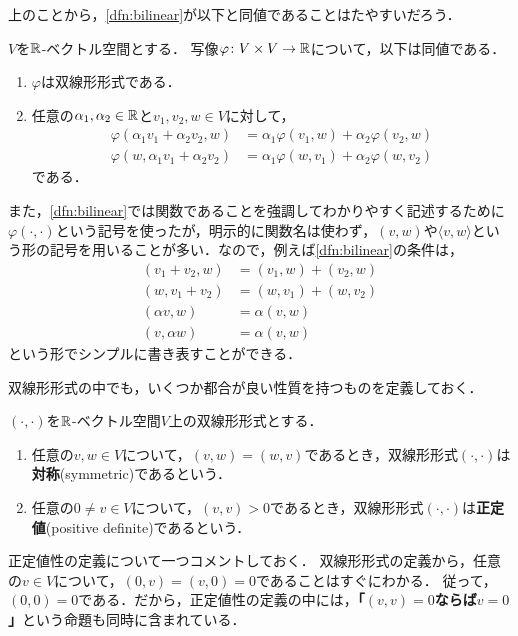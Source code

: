 上のことから，\cref{dfn:bilinear}が以下と同値であることはたやすいだろう．
\begin{prop}
  $V$を$\mathbb{R}$-ベクトル空間とする．
  写像$\varphi\colon V \times V \to \mathbb{R}$について，以下は同値である．
  \begin{enumerate}
    \item $\varphi$は双線形形式である．
    \item 任意の$\alpha_1,\alpha_2 \in \mathbb{R}$と$v_1,v_2,w\in V$に対して，
    \[
      \begin{aligned}
        \varphi(\alpha_1 v_1 + \alpha_2 v_2, w) &= \alpha_1 \varphi(v_1,w) + \alpha_2 \varphi (v_2,w) \\
        \varphi(w, \alpha_1 v_1 + \alpha_2 v_2) &= \alpha_1 \varphi(w,v_1) + \alpha_2 \varphi (w,v_2)
      \end{aligned}
    \]
    である．
  \end{enumerate}
\end{prop}

また，\cref{dfn:bilinear}では関数であることを強調してわかりやすく記述するために$\varphi(\cdot,\cdot)$という記号を使ったが，明示的に関数名は使わず，$(v,w)$や$\langle v,w\rangle$という形の記号を用いることが多い．なので，例えば\cref{dfn:bilinear}の条件は，
\[
  \begin{aligned}
    (v_1 + v_2, w) &= (v_1,w) + (v_2,w) \\
    (w, v_1 + v_2) &= (w,v_1) + (w,v_2) \\
    (\alpha v, w) &= \alpha (v,w) \\
    (v,\alpha w) &= \alpha (v,w)
  \end{aligned}  
\]
という形でシンプルに書き表すことができる．

双線形形式の中でも，いくつか都合が良い性質を持つものを定義しておく．
\begin{dfn}
$(\cdot,\cdot)$を$\mathbb{R}$-ベクトル空間$V$上の双線形形式とする．
\begin{enumerate}
  \item 任意の$v,w \in V$について，$(v,w)=(w,v)$であるとき，双線形形式$(\cdot,\cdot)$は\textbf{対称}(symmetric)であるという．
  \item 任意の$0 \neq v \in V$について，$(v,v) > 0$であるとき，双線形形式$(\cdot,\cdot)$は\textbf{正定値}(positive definite)であるという．
\end{enumerate}
\end{dfn}
正定値性の定義について一つコメントしておく．
双線形形式の定義から，任意の$v \in V$について，$(0,v)=(v,0)=0$であることはすぐにわかる．
従って，$(0,0)=0$である．だから，正定値性の定義の中には，\textbf{「$(v,v)=0$ならば$v=0$」}という命題も同時に含まれている．

